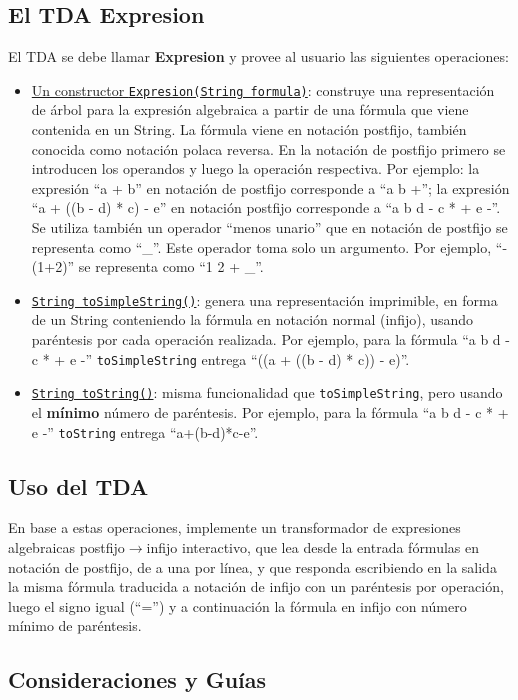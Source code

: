 \documentclass[dcc]{fcfmcourse}
\begin{document}
\subsection{El TDA Expresion}
El TDA se debe llamar \textbf{Expresion} y provee al usuario las siguientes
operaciones:
\begin{itemize}
\item \underline{Un constructor \texttt{Expresion(String formula)}}: construye una representación
de árbol para la expresión algebraica a partir de una fórmula
que viene contenida en un String. La fórmula viene en notación postfijo, también conocida como notación polaca reversa. En la notación
de postfijo primero se introducen los operandos y luego la operación
respectiva. Por ejemplo: la expresión “a + b” en notación de postfijo
corresponde a “a b +”; la expresión “a + ((b - d) * c) - e” en notación
postfijo corresponde a “a b d - c * + e -”. Se utiliza también un operador
“menos unario” que en notación de postfijo se representa como
“\_”. Este operador toma solo un argumento. Por ejemplo, “-(1+2)” se
representa como “1 2 + \_”.
\item \underline{\texttt{String toSimpleString()}}: genera una representación imprimible, en forma
de un String conteniendo la fórmula en notación normal (infijo), usando
paréntesis por cada operación realizada. Por ejemplo, para la fórmula “a b d - c * + e -” \texttt{toSimpleString}  entrega “((a + ((b - d) * c)) - e)”.
\item \underline{\texttt{String toString()}}: misma funcionalidad que \texttt{toSimpleString}, pero usando
el \textbf{mínimo} número de paréntesis. Por ejemplo, para la fórmula “a b d - c * + e -” \texttt{toString}  entrega “a+(b-d)*c-e”.

\end{itemize}
\subsection{Uso del TDA}
En base a estas operaciones, implemente un transformador de expresiones algebraicas postfijo$\rightarrow$infijo interactivo, que lea desde la entrada fórmulas en notación de postfijo, de a una por línea, y que responda escribiendo en la salida la misma fórmula traducida a notación de infijo con un paréntesis por operación, luego el signo igual (“=”) y a continuación  la fórmula en infijo con número mínimo de paréntesis.\\
\subsection{Consideraciones y Guías}
\end{document}
